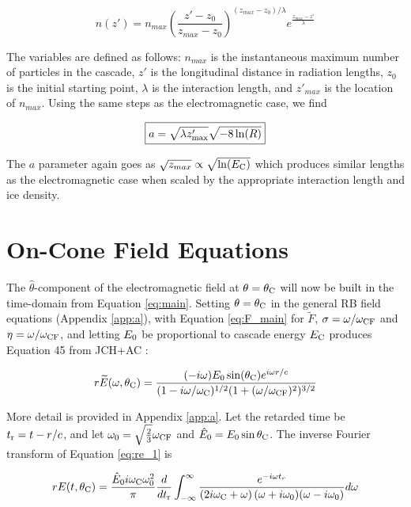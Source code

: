 \documentclass[amsmath,amssymb,aps,prd,10pt,twocolumn]{revtex4}
\begin{document}
\begin{equation}
n(z') = n_{max} \left( \frac{z'-z_{0}}{z_{max} - z_{0}} \right)^{(z_{max} - z_{0})/\lambda} e^{ \frac{z_{max} - z'}{\lambda}}
\end{equation}

The variables are defined as follows: $n_{max}$ is the instantaneous maximum number of particles in the cascade, $z'$ is the longitudinal distance in radiation lengths, $z_0$ is the initial starting point, $\lambda$ is the interaction length, and $z'_{max}$ is the location of $n_{max}$.  Using the same steps as the electromagnetic case, we find

\begin{equation}
\boxed{
a = \sqrt{\lambda z'_{\rm max}} \sqrt{-8 \ln(R)}
} \label{eq:main_2}
\end{equation}

The $a$ parameter again goes as $\sqrt{z_{max}} \propto \sqrt{\ln(E_{\rm C})}$ which produces similar lengths as the electromagnetic case when scaled by the appropriate interaction length and ice density.

\section{On-Cone Field Equations}
\label{sec:onc}

The $\hat{\theta}$-component of the electromagnetic field at $\theta = \theta_{\rm C}$ will now be built in the time-domain from Equation \ref{eq:main}.  Setting $\theta = \theta_{\rm C}$ in the general RB field equations (Appendix \ref{app:a}), with Equation \ref{eq:F_main} for $\widetilde{F}$, $\sigma = \omega/\omega_{\rm CF}$ and $\eta = \omega/\omega_{\rm CF}$, and letting $E_{\rm 0}$ be proportional to cascade energy $E_{\rm C}$ produces Equation 45 from JCH+AC \cite{10.1016/j.astropartphys.2017.03.008}:

\begin{equation}
r\widetilde{E}(\omega,\theta_{\rm C}) = \frac{(-i\omega) E_0 \sin(\theta_{\rm C}) e^{i\omega r/c}}{(1-i \omega/\omega_{\rm C})^{1/2} (1+(\omega/\omega_{\rm CF})^2)^{3/2}} \label{eq:re_1}
\end{equation}

More detail is provided in Appendix \ref{app:a}. Let the retarded time be $t_{\rm r} = t - r/c$, and let $\omega_0 = \sqrt{\frac{2}{3	}}\omega_{\rm CF}$ and $\hat{E}_{\rm 0} = E_{\rm 0} \sin\theta_{\rm C}$.  The inverse Fourier transform of Equation \ref{eq:re_1} is

\begin{widetext}
\begin{equation}
r E(t,\theta_{\rm C}) = \frac{\hat{E}_0 i \omega_{\rm C} \omega_{\rm 0}^2}{\pi} \frac{d}{dt_{\rm r}}\int_{-\infty}^{\infty} \frac{ e^{-i\omega t_r}}{ \left(2 i \omega_{\rm C} + \omega \right) (\omega+i\omega_{\rm 0}) (\omega - i\omega_{\rm 0}) } d\omega \label{eq:part1}
\end{equation}
\end{widetext}
\end{document}
